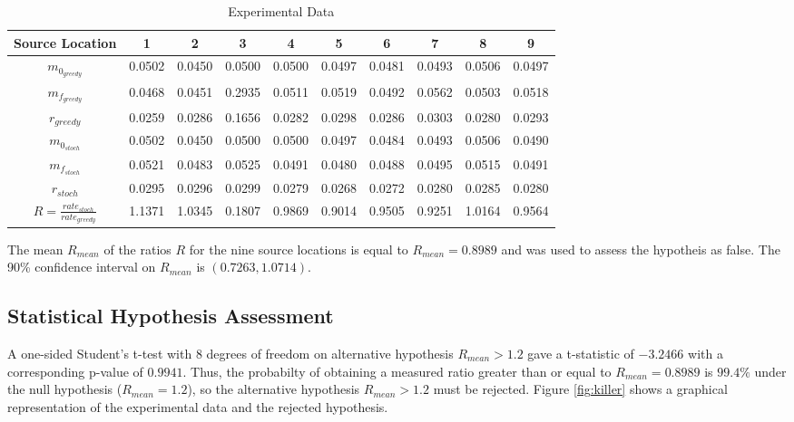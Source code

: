 \documentclass[submit, 12pt]{aiaa-pretty-modified}
\begin{document}
\begin{table}[htb]
\begin{center}
\begin{tabular}{|c||c||c||c||c||c||c||c||c||c|}
\hline
 Source Location & 1 & 2 & 3 & 4 & 5 & 6 & 7 & 8 & 9 \\
\hline \hline
$m_{0_{greedy}}$ & 0.0502 & 0.0450 & 0.0500 & 0.0500 & 0.0497 & 0.0481 & 0.0493 & 0.0506 & 0.0497 \\
\hline
$m_{f_{greedy}}$ & 0.0468 & 0.0451 & 0.2935 & 0.0511 & 0.0519 & 0.0492 & 0.0562 & 0.0503 & 0.0518 \\
\hline
$r_{greedy}$ & 0.0259 & 0.0286 & 0.1656 & 0.0282 & 0.0298 & 0.0286 & 0.0303 & 0.0280 & 0.0293 \\
\hline
$m_{0_{stoch}}$ & 0.0502 & 0.0450 & 0.0500 & 0.0500 & 0.0497 & 0.0484 & 0.0493 & 0.0506 & 0.0490 \\
\hline
$m_{f_{stoch}}$ & 0.0521 & 0.0483 & 0.0525 & 0.0491 & 0.0480 & 0.0488 & 0.0495 & 0.0515 & 0.0491 \\
\hline
$r_{stoch}$ & 0.0295 & 0.0296 & 0.0299 & 0.0279 & 0.0268 & 0.0272 & 0.0280 & 0.0285 & 0.0280 \\
\hline
\hline
$R = \frac{rate_{stoch}}{rate_{greedy}}$  & 1.1371 & 1.0345 & 0.1807 & 0.9869 &
0.9014 & 0.9505  & 0.9251 & 1.0164 & 0.9564\\
\hline
\end{tabular}
\caption{Experimental Data \label{tab:data} }
\end{center}
\end{table}

The mean $R_{mean}$ of the ratios $R$ for the nine source locations is equal to
$R_{mean} = 0.8989$ and was used to assess the hypotheis as false. The
90\% confidence interval on $R_{mean}$ is $(0.7263, 1.0714)$.

\subsection{Statistical Hypothesis Assessment}
A one-sided Student's t-test with 8 degrees of freedom on alternative
hypothesis $R_{mean} > 1.2$ gave a t-statistic of $-3.2466$ with a
corresponding p-value of $0.9941$.  Thus, the probabilty of
obtaining a measured ratio greater than or equal to $R_{mean} = 0.8989$
is $99.4\%$ under the null hypothesis ($R_{mean} = 1.2$), so the
alternative hypothesis $R_{mean} > 1.2$ must be rejected.  Figure
\ref{fig:killer} shows a graphical representation of the experimental
data and the rejected hypothesis.
\end{document}
